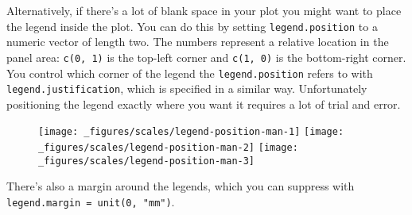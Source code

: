 Alternatively, if there's a lot of blank space in your plot you might
want to place the legend inside the plot. You can do this by setting
\texttt{legend.position} to a numeric vector of length two. The numbers
represent a relative location in the panel area: \texttt{c(0,\ 1)} is
the top-left corner and \texttt{c(1,\ 0)} is the bottom-right corner.
You control which corner of the legend the \texttt{legend.position}
refers to with \texttt{legend.justification}, which is specified in a
similar way. Unfortunately positioning the legend exactly where you want
it requires a lot of trial and error.

\begin{Shaded}
\begin{Highlighting}[]
\StringTok{ }\OperatorTok{+}\StringTok{ }
\StringTok{  }\NormalTok{(}\NormalTok{(} \NormalTok{)}

\OperatorTok{+}\StringTok{ }\NormalTok{(} \NormalTok{(}\NormalTok{, }\NormalTok{), } \NormalTok{(}\NormalTok{, }\NormalTok{))}
\OperatorTok{+}\StringTok{ }\NormalTok{(} \NormalTok{(}\NormalTok{, }\NormalTok{), } \NormalTok{(}\NormalTok{, }\NormalTok{))}
\OperatorTok{+}\StringTok{ }\NormalTok{(} \NormalTok{(}\NormalTok{, }\NormalTok{), } \NormalTok{(}\NormalTok{, }\NormalTok{))}
\end{Highlighting}
\end{Shaded}

\begin{figure}[H]
  \texttt{[image: \_figures/scales/legend-position-man-1]}%
  \texttt{[image: \_figures/scales/legend-position-man-2]}%
  \texttt{[image: \_figures/scales/legend-position-man-3]}
\end{figure}

There's also a margin around the legends, which you can suppress with
\texttt{legend.margin\ =\ unit(0,\ "mm")}.

